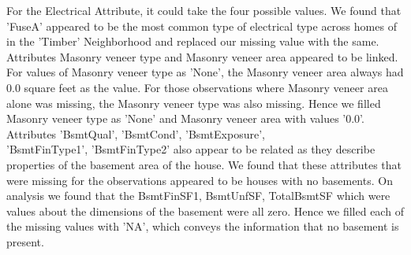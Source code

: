 \documentclass[fleqn,10pt]{SelfArx} %
\begin{document}
	For the Electrical Attribute, it could take the four possible values. We found that 'FuseA' appeared to be the most common type of electrical type across homes of in the 'Timber' Neighborhood and replaced our missing value with the same. Attributes Masonry veneer type and Masonry veneer area appeared to be linked. For values of Masonry veneer type as 'None', the Masonry veneer area always had 0.0 square feet as the value. For those observations where Masonry veneer area alone was missing, the Masonry veneer type was also missing. Hence we filled Masonry veneer type as  'None' and Masonry veneer area with values '0.0'.\\ 
	
	Attributes 'BsmtQual', 'BsmtCond',    'BsmtExposure',\\
	'BsmtFinType1', 'BsmtFinType2' also appear to be related as they describe properties of the basement area of the house. We found that these attributes that were missing for the observations appeared to be houses with no basements. On analysis we found that the BsmtFinSF1, BsmtUnfSF, TotalBsmtSF which were values about the dimensions of the basement were all zero. Hence we filled each of the missing values with 'NA', which conveys the information that no basement is present. 
	
\end{document}
